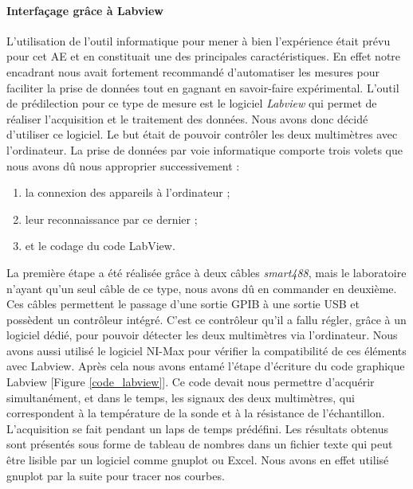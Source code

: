 \paragraph{Interfaçage grâce à Labview}
L'utilisation de l'outil informatique pour mener à bien l'expérience était prévu pour cet AE 
et en constituait une des principales caractéristiques. En effet notre encadrant nous avait fortement recommandé 
d'automatiser les mesures pour faciliter la prise de données tout en gagnant en savoir-faire expérimental. L'outil de 
prédilection pour ce type de mesure est le logiciel \emph{Labview} qui permet de réaliser l'acquisition et le traitement des données. 
Nous avons donc décidé d'utiliser ce logiciel. Le but était de pouvoir contrôler les deux multimètres avec l'ordinateur. 
La prise de données par voie informatique comporte trois volets que nous avons dû nous approprier successivement : 

\begin{enumerate}
\item la connexion des appareils à l'ordinateur ; 
\item leur reconnaissance par ce dernier ; 
\item et le codage du code LabView. 
\end{enumerate}

La première étape a été réalisée grâce à deux câbles \emph{smart488}, mais le laboratoire n'ayant qu'un seul câble de ce type, nous avons dû en commander en deuxième.
Ces câbles permettent le passage d'une sortie GPIB à une sortie USB et possèdent un contrôleur intégré. 
C'est ce contrôleur qu'il a fallu régler, grâce à un logiciel dédié, pour pouvoir détecter les deux multimètres 
via l'ordinateur. Nous avons aussi utilisé le logiciel NI-Max pour vérifier la compatibilité de ces éléments avec Labview. 
Après cela nous avons entamé l'étape d'écriture du code graphique Labview [Figure \ref{code_labview}]. Ce code devait nous permettre d'acquérir 
simultanément, et dans le temps, les signaux des deux multimètres, qui correspondent à la température de la sonde 
et à la résistance de l'échantillon. L'acquisition se fait pendant un laps de temps prédéfini. Les résultats obtenus sont présentés sous forme de tableau de nombres dans un fichier texte qui peut être lisible par un logiciel comme gnuplot ou Excel.
Nous avons en effet utilisé gnuplot par la suite pour tracer nos courbes.

